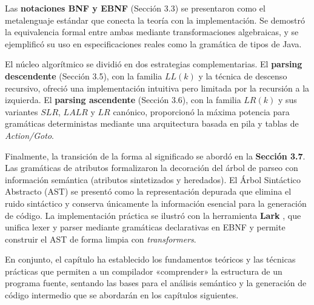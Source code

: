 Las \textbf{notaciones BNF y EBNF} (Sección 3.3) se presentaron como el metalenguaje estándar que conecta la teoría con la implementación. Se demostró la equivalencia formal entre ambas mediante transformaciones algebraicas, y se ejemplificó su uso en especificaciones reales como la gramática de tipos de Java.

El núcleo algorítmico se dividió en dos estrategias complementarias. El \textbf{parsing descendente} (Sección 3.5), con la familia $LL(k)$ y la técnica de descenso recursivo, ofreció una implementación intuitiva pero limitada por la recursión a la izquierda. El \textbf{parsing ascendente} (Sección 3.6), con la familia $LR(k)$ y sus variantes $SLR$, $LALR$ y $LR$ canónico, proporcionó la máxima potencia para gramáticas deterministas mediante una arquitectura basada en pila y tablas de \textit{Action/Goto}.

Finalmente, la transición de la forma al significado se abordó en la \textbf{Sección 3.7}. Las gramáticas de atributos formalizaron la decoración del árbol de parseo con información semántica (atributos sintetizados y heredados). El Árbol Sintáctico Abstracto (AST) se presentó como la representación depurada que elimina el ruido sintáctico y conserva únicamente la información esencial para la generación de código. La implementación práctica se ilustró con la herramienta \textbf{Lark} \cite{lark2025}, que unifica lexer y parser mediante gramáticas declarativas en EBNF y permite construir el AST de forma limpia con \textit{transformers}.

En conjunto, el capítulo ha establecido los fundamentos teóricos y las técnicas prácticas que permiten a un compilador «comprender» la estructura de un programa fuente, sentando las bases para el análisis semántico y la generación de código intermedio que se abordarán en los capítulos siguientes.

\printbibliography[segment=\therefsegment, heading=subbibliography]
